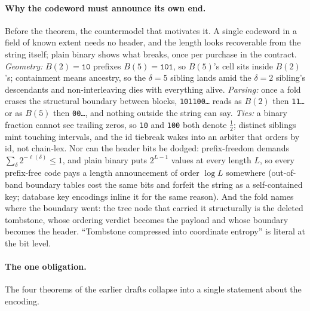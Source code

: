 \documentclass[11pt]{article}
\newcommand{\code}[1]{\texttt{#1}}
\begin{document}
\paragraph{Why the codeword must announce its own end.} Before the
theorem, the countermodel that motivates it. A single codeword in a
field of known extent needs no header, and the length looks
recoverable from the string itself; plain binary shows what breaks,
once per purchase in the contract. \emph{Geometry:} $B(2) = \code{10}$
prefixes $B(5) = \code{101}$, so $B(5)$'s cell sits inside $B(2)$'s;
containment means ancestry, so the $\delta{=}5$ sibling lands amid
the $\delta{=}2$ sibling's descendants and non-interleaving dies
with everything alive. \emph{Parsing:} once a fold erases the
structural boundary between blocks, \code{101100\ldots} reads as
$B(2)$ then \code{11\ldots} or as $B(5)$ then \code{00\ldots}, and
nothing outside the string can say. \emph{Ties:} a binary fraction
cannot see trailing zeros, so \code{10} and \code{100} both denote
$\tfrac12$; distinct siblings mint touching intervals, and the id
tiebreak wakes into an arbiter that orders by id, not chain-lex.
Nor can the header bits be dodged: prefix-freedom demands
$\sum_\delta 2^{-\ell(\delta)} \le 1$, and plain binary puts
$2^{L-1}$ values at every length $L$, so every prefix-free code
pays a length announcement of order $\log L$ somewhere (out-of-band
boundary tables cost the same bits and forfeit the string as a
self-contained key; database key encodings inline it for the same
reason). And the fold names where the boundary went: the tree node
that carried it structurally is the deleted tombstone, whose
ordering verdict becomes the payload and whose boundary becomes the
header. ``Tombstone compressed into coordinate entropy'' is literal
at the bit level.

\paragraph{The one obligation.} The four theorems of the earlier
drafts collapse into a single statement about the encoding.
\end{document}

